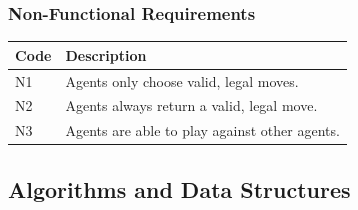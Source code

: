 \documentclass[12pt,a4paper]{article}
\begin{document}
    \subsubsection*{Non-Functional Requirements}

        
    \begin{center}
        \begin{tabular*}{1\textwidth}{| l | p{144.5mm} |}
        \hline
        Code & Description \\ \hline
        N1 & Agents only choose valid, legal moves. \\ \hline
        N2 & Agents always return a valid, legal move.\\ \hline
        N3 & Agents are able to play against other agents. \\ \hline
        \end{tabular*}
    \end{center}



\subsection*{Algorithms and Data Structures}
\end{document}

